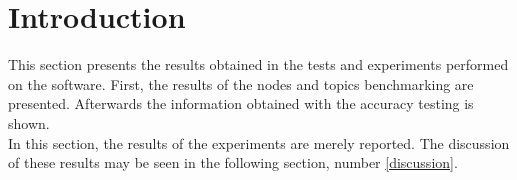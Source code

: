 \section{Introduction}

This section presents the results obtained in the tests and experiments performed on the software. 
First, the results of the nodes and topics benchmarking are presented. 
Afterwards the information obtained with the accuracy testing is shown. 
\\

In this section, the results of the experiments are merely reported. 
The discussion of these results may be seen in the following section, number \ref{discussion}.